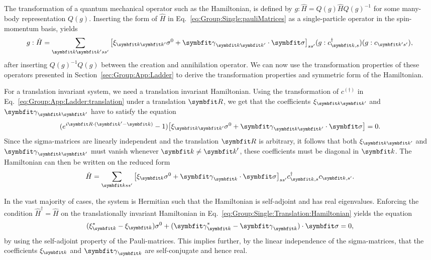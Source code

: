 The transformation of a quantum mechanical operator such as the Hamiltonian, is defined by $g:\hat{H} = Q(g)\hat{H}Q(g)^{-1}$ for some many-body
representation $Q(g)$. Inserting the form of $\hat{H}$ in Eq.~\eqref{eq:Group:Single:pauliMatrices} as a single-particle operator in the
spin-momentum basis, yields
\begin{equation}
    \label{eq:Group:Single:generalTransformedHamiltonian}
    g:\hat{H} = \sum_{\v{k}\v{k}'ss'}\big[\xi_{\v{k}\v{k}'}\sigma^0 + \v{\gamma}_{\v{k}\v{k}'}\cdot\v{\sigma}\big]_{ss'}(g:c^\dagger_{\v{k},s})(g:c_{\v{k}'s'}),
\end{equation}
after inserting $Q(g)^{-1}Q(g)$ between the creation and annihilation operator. We can now use the transformation properties of these operators presented
in Section~\ref{sec:Group:App:Ladder} to derive the transformation properties and symmetric form of the Hamiltonian.

For a translation invariant system, we need a translation invariant Hamiltonian. Using the transformation of $c^{(\dagger)}$ in
Eq.~\eqref{eq:Group:App:Ladder:translation} under a translation $\v{R}$, we get that the coefficients $\xi_{\v{k}\v{k}'}$ and $\v{\gamma}_{\v{k}\v{k}'}$
have to satisfy the equation
\begin{equation}
    \label{eq:Group:Single:Translation:condition}
    (e^{i\v{R}\cdot(\v{k}'-\v{k})}-1)\big[\xi_{\v{k}\v{k}'}\sigma^0 + \v{\gamma}_{\v{k}\v{k}'}\cdot\v{\sigma}\big] = 0.
\end{equation}
Since the sigma-matrices are linearly independent and the translation $\v{R}$ is arbitrary, it follows that both $\xi_{\v{k}\v{k}'}$ and
$\v{\gamma}_{\v{k}\v{k}'}$ must vanish whenever $\v{k}\neq\v{k}'$, \ie these coefficients must be diagonal in $\v{k}$. The Hamiltonian can then be written on the
reduced form
\begin{equation}
    \label{eq:Group:Single:Translation:Hamiltonian}
    \hat{H} = \sum_{\v{k}ss'}\big[\xi_\v{k}\sigma^0 + \v{\gamma}_\v{k}\cdot\v{\sigma}\big]_{ss'}c^{\dagger}_{\v{k},s}c_{\v{k},s'}.
\end{equation}

In the vast majority of cases, the system is Hermitian such that the Hamiltonian is self-adjoint and has real eigenvalues. Enforcing the condition
$\hat{H}^\dagger=\hat{H}$ on the translationally invariant Hamiltonian in Eq.~\eqref{eq:Group:Single:Translation:Hamiltonian} yields the equation
\begin{equation}
    \label{eq:Group:Single:Hermitian:condition}
    (\xi_\v{k}^\ast-\xi_{\v{k}})\sigma^0 + (\v{\gamma}^\ast_\v{k}-\v{\gamma}_\v{k})\cdot\v{\sigma} = 0,
\end{equation}
by using the self-adjoint property of the Pauli-matrices. This implies further, by the linear independence of the sigma-matrices, that the coefficients $\xi_\v{k}$
and $\v{\gamma}_\v{k}$ are self-conjugate and hence real.

